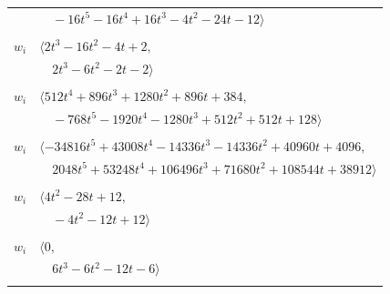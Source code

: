 \documentclass[11pt]{article}
\begin{document}
\begin{longtable}{@{}ll@{}}
 & $\quad -16t^{5}-16t^{4}+16t^{3}-4t^{2}-24t-12\rangle$\\
\addlinespace[2pt]
\multicolumn{2}{@{}p{0.97\textwidth}@{}}{$i=35$, $D_i=4$, $\rho_{ij}$: $13{:}1, \allowbreak 15{:}2, \allowbreak 22{:}2, \allowbreak 26{:}1, \allowbreak 28{:}1, \allowbreak 33{:}1, \allowbreak 38{:}2$}\\
$w_i$ & $\langle 2t^{3}-16t^{2}-4t+2,$\\
 & $\quad 2t^{3}-6t^{2}-2t-2\rangle$\\
\addlinespace[2pt]
\multicolumn{2}{@{}p{0.97\textwidth}@{}}{$i=36$, $D_i=128$, $\rho_{ij}$: $1{:}1, \allowbreak 3{:}1, \allowbreak 13{:}2, \allowbreak 22{:}1, \allowbreak 30{:}1, \allowbreak 37{:}2, \allowbreak 40{:}2, \allowbreak 44{:}2$}\\
$w_i$ & $\langle 512t^{4}+896t^{3}+1280t^{2}+896t+384,$\\
 & $\quad -768t^{5}-1920t^{4}-1280t^{3}+512t^{2}+512t+128\rangle$\\
\addlinespace[2pt]
\multicolumn{2}{@{}p{0.97\textwidth}@{}}{$i=37$, $D_i=2048$, $\rho_{ij}$: $0{:}1, \allowbreak 1{:}2, \allowbreak 5{:}2, \allowbreak 13{:}1, \allowbreak 24{:}1, \allowbreak 27{:}2, \allowbreak 34{:}2, \allowbreak 36{:}1, \allowbreak 39{:}1, \allowbreak 41{:}1, \allowbreak 46{:}1, \allowbreak 48{:}1$}\\
$w_i$ & $\langle -34816t^{5}+43008t^{4}-14336t^{3}-14336t^{2}+40960t+4096,$\\
 & $\quad 2048t^{5}+53248t^{4}+106496t^{3}+71680t^{2}+108544t+38912\rangle$\\
\addlinespace[2pt]
\multicolumn{2}{@{}p{0.97\textwidth}@{}}{$i=38$, $D_i=2$, $\rho_{ij}$: $15{:}1, \allowbreak 24{:}1, \allowbreak 28{:}2, \allowbreak 29{:}1, \allowbreak 31{:}2, \allowbreak 35{:}1, \allowbreak 43{:}1, \allowbreak 44{:}1, \allowbreak 47{:}2, \allowbreak 48{:}2$}\\
$w_i$ & $\langle 4t^{2}-28t+12,$\\
 & $\quad -4t^{2}-12t+12\rangle$\\
\addlinespace[2pt]
\multicolumn{2}{@{}p{0.97\textwidth}@{}}{$i=39$, $D_i=4$, $\rho_{ij}$: $21{:}1, \allowbreak 31{:}1, \allowbreak 37{:}2, \allowbreak 41{:}2, \allowbreak 42{:}2, \allowbreak 46{:}1$}\\
$w_i$ & $\langle 0,$\\
 & $\quad 6t^{3}-6t^{2}-12t-6\rangle$\\
\addlinespace[2pt]
\multicolumn{2}{@{}p{0.97\textwidth}@{}}{$i=40$, $D_i=8$, $\rho_{ij}$: $5{:}1, \allowbreak 10{:}1, \allowbreak 11{:}2, \allowbreak 17{:}2, \allowbreak 24{:}2, \allowbreak 28{:}1, \allowbreak 34{:}2, \allowbreak 36{:}1, \allowbreak 45{:}2$}\\

\end{longtable}
\end{document}
